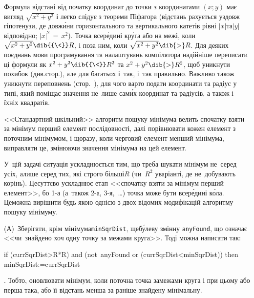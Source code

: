 \Tutorial
Формула відстані від початку координат до точки з координатами $(x;y)$ має вигляд $\sqrt{x^2+y^2}$ і легко слідує з теореми Піфагора (відстань рахується уздовж гіпотенузи, де довж\'{и}ни горизонтального та вертикального катетів рівні $|x|$\nolinebreak[1] та\nolinebreak[3] $|y|$ відповідно; ${|x|^2\,{=}\,x^2}$). Точка всер\'{е}дині кр\'{у}га або на межі, коли $\sqrt{x^2+y^2}\dib{{\<}}R$, і поза ним, коли $\sqrt{x^2+y^2}\dib{{>}}R$. Для деяких поєднань мови програмування та налаштувань компілятора надійніше переписати ці формули як ${x^2+y^2}\dib{{\<}}R^2$ та ${x^2+y^2}\dib{{>}}R^2$, щоб уникнути похибок (див.\nolinebreak[2] стор.\nolinebreak[3] \pageref{sec:floating-point}), але для багатьох %
і~так, і~так правильно. Важливо також уникнути переповнень (стор.~\pageref{text:overflow-example}), для чого варто подати координати та радіус у типі, який поміщає значення не~лише сам\'{и}х координат та радіусів, а також і їхніх квадратів.

<<Стандартний шкільний>> алгоритм пошуку мінімума велить спочатку взяти за мінімум перший елемент послідовності, далі порівнювати кожен елемент з поточним мінімумом, і щоразу, коли черговий елемент менший мінімума, виправляти це, змінюючи значення мінімума на цей елемент. 
\ifAfour\else\par\fi
У~цій задачі ситуація ускладнюється тим, що треба шукати мінімум не~серед усіх, а\nolinebreak[3] лише серед тих, які строго більші\nolinebreak[3] $R$ (чи~$R^2$ у\nolinebreak[3] варіанті, де не~добувають корінь). Це\nolinebreak[3] суттєво ускладнює етап <<спочатку взяти за мінімум перший елемент>>, бо 
\mbox{1-а} (а~також \mbox{2-а}, \mbox{3-я},~\dots) 
точка може бути всер\'{е}дині к\'{о}ла.
Це\nolinebreak[3] можна вирішити будь-якою однією з двох відомих модифікацій алгоритму пошуку мінімуму. 

(А)~Зберігати, крім мінімума\nolinebreak[2] \texttt{minSqrDist}, 
ще\nolinebreak[2] б\'{у}леву змінну \texttt{anyFound}, що означає <<чи~знайдено хоч одну точку за межами круга>>. Тоді %
можна написати так: 
\begin{ttfamily}{if (currSqrDist>R*R)\hspace{0.125em plus 0.5em} and\hspace{0.125em plus 0.5em} (not~anyFound\hspace{0em plus 0.25em} or\hspace{0em plus 0.25em} (currSqrDist<minSqrDist)) then minSqrDist:=currSqrDist}\end{ttfamily}. Тобто, оновлювати мінімум, коли поточна точка за\nolinebreak[3] межами круга і при цьому або перша така, або її відстань менша за раніше знайдену мінімальну.

